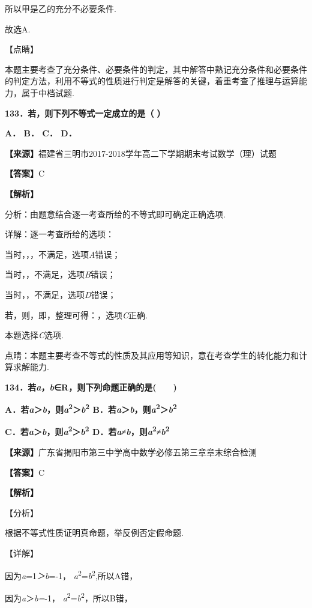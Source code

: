 \documentclass[
]{article}
\begin{document}
所以甲是乙的充分不必要条件.

故选A.

【点睛】

本题主要考查了充分条件、必要条件的判定，其中解答中熟记充分条件和必要条件的判定方法，利用不等式的性质进行判定是解答的关键，着重考查了推理与运算能力，属于中档试题.

\textbf{133．若，则下列不等式一定成立的是（ ）}

\textbf{A． B． C． D．}

\textbf{【来源】}福建省三明市2017-2018学年高二下学期期末考试数学（理）试题

\textbf{【答案】}C

\textbf{【解析】}

分析：由题意结合逐一考查所给的不等式即可确定正确选项.

详解：逐一考查所给的选项：

当时，，，不满足，选项\emph{A}错误；

当时，，不满足，选项\emph{B}错误；

当时，，不满足，选项\emph{D}错误；

若，则，即，整理可得：，选项\emph{C}正确.

本题选择\emph{C}选项.

点睛：本题主要考查不等式的性质及其应用等知识，意在考查学生的转化能力和计算求解能力.

\textbf{134．若\emph{a}，\emph{b}∈R，则下列命题正确的是(　　)}

\textbf{A．若\emph{a}＞\emph{b}，则\emph{a}\textsuperscript{2}＞\emph{b}\textsuperscript{2}
B．若\textbar{}\emph{a}\textbar＞\emph{b}，则\emph{a}\textsuperscript{2}＞\emph{b}\textsuperscript{2}}

\textbf{C．若\emph{a}＞\textbar{}\emph{b}\textbar，则\emph{a}\textsuperscript{2}＞\emph{b}\textsuperscript{2}
D．若\emph{a}≠\textbar{}\emph{b}\textbar，则\emph{a}\textsuperscript{2}≠\emph{b}\textsuperscript{2}}

\textbf{【来源】}广东省揭阳市第三中学高中数学必修五第三章章末综合检测

\textbf{【答案】}C

\textbf{【解析】}

【分析】

根据不等式性质证明真命题，举反例否定假命题.

【详解】

因为\emph{a}=1\emph{＞b}=-1，
\emph{a}\textsuperscript{2}=\emph{b}\textsuperscript{2},所以A错，

因为\textbar{}\emph{a}＞\emph{b=}-1，
\emph{a}\textsuperscript{2}=\emph{b}\textsuperscript{2}，所以B错，
\end{document}
